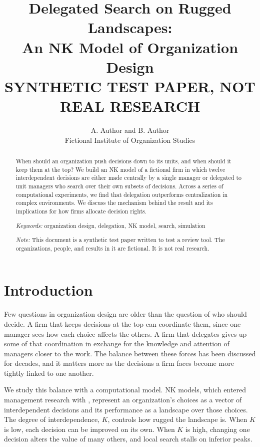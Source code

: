 \documentclass[11pt]{article}
\title{Delegated Search on Rugged Landscapes:\\An NK Model of Organization Design\\[1em]
{\normalsize\textbf{SYNTHETIC TEST PAPER, NOT REAL RESEARCH}}}
\author{A. Author and B. Author\\Fictional Institute of Organization Studies}
\date{}
\begin{document}
\maketitle
\thispagestyle{plain}

\begin{abstract}
\noindent
When should an organization push decisions down to its units, and when should it keep them at the top? We build an NK model of a fictional firm in which twelve interdependent decisions are either made centrally by a single manager or delegated to unit managers who search over their own subsets of decisions. Across a series of computational experiments, we find that delegation outperforms centralization in complex environments. We discuss the mechanism behind the result and its implications for how firms allocate decision rights.

\medskip
\noindent\textit{Keywords:} organization design, delegation, NK model, search, simulation

\medskip
\noindent\textit{Note:} This document is a synthetic test paper written to test a review tool. The organizations, people, and results in it are fictional. It is not real research.
\end{abstract}

\section{Introduction}

Few questions in organization design are older than the question of who should decide. A firm that keeps decisions at the top can coordinate them, since one manager sees how each choice affects the others. A firm that delegates gives up some of that coordination in exchange for the knowledge and attention of managers closer to the work. The balance between these forces has been discussed for decades, and it matters more as the decisions a firm faces become more tightly linked to one another.

We study this balance with a computational model. NK models, which entered management research with \citet{levinthal1997}, represent an organization's choices as a vector of interdependent decisions and its performance as a landscape over those choices. The degree of interdependence, $K$, controls how rugged the landscape is. When $K$ is low, each decision can be improved on its own. When $K$ is high, changing one decision alters the value of many others, and local search stalls on inferior peaks.
\end{document}
